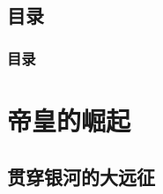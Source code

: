 \documentclass{beamer}
\begin{document}
\begin{frame}
\begin{columns}
\begin{column}{0.4\textwidth}
       \\
  \end{column}
  \end{columns}
\end{frame}

\subsection*{\textbf{目录}}

\begin{frame}
  \frametitle{\textbf{目录}}
  \tableofcontents[hideallsubsections]
\end{frame}

\section[\textbf{帝皇的崛起}]{\textbf{帝皇的崛起}}

\subsection{\textbf{贯穿银河的大远征}}
\end{document}
